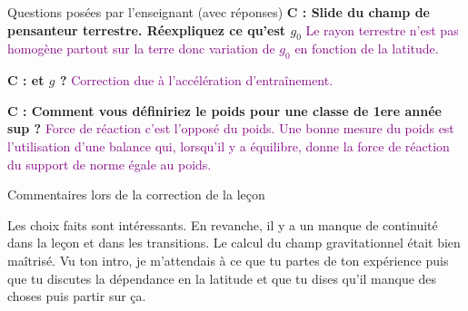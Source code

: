 \begin{reportBlock}{Questions posées par l’enseignant (avec réponses)}
  \textbf{C : Slide du champ de pensanteur terrestre. Réexpliquez ce qu'est $g_0$}  \textcolor{purple}{Le rayon terrestre n'est pas homogène partout sur la terre donc variation de $g_0$ en fonction de la latitude.}\newline
 
  \textbf{C : et $g$ ?}  \textcolor{purple}{Correction due à l'accélération d'entraînement.}\newline 
  
  \textbf{C : Comment vous définiriez le poids pour une classe de 1ere année sup ?}  \textcolor{purple}{Force de réaction c'est  l'opposé du poids. Une bonne mesure du poids est l'utilisation d'une balance qui, lorsqu'il y a équilibre, donne la force de réaction du support de norme égale au poids.}\newline 

  
\end{reportBlock}


\begin{reportBlock}{Commentaires lors de la correction de la leçon}

Les choix faits sont intéressants. En revanche, il y a un manque de continuité dans la leçon et dans les transitions. Le calcul du champ gravitationnel était bien maîtrisé. Vu ton intro, je m'attendais à ce que tu partes de ton expérience puis que tu discutes la dépendance en la latitude et que tu dises qu'il manque des choses puis partir sur ça.

\end{reportBlock}



